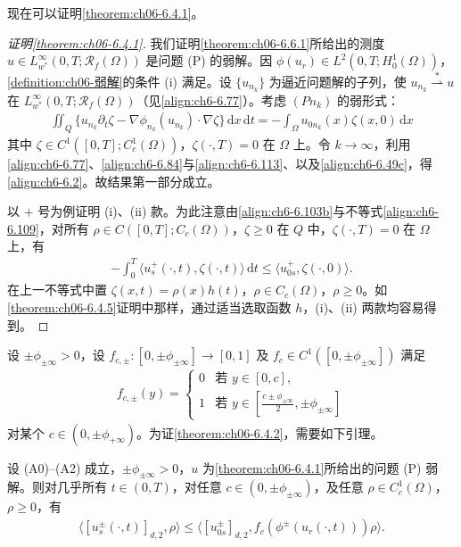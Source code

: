 \documentclass[../../main.tex]{subfiles}%
\begin{document}
现在可以证明\cref{theorem:ch06-6.4.1}。

\begin{proof}[证明\cref{theorem:ch06-6.4.1}]
我们证明\cref{theorem:ch06-6.6.1}所给出的测度 $u\in L^\infty_{w^*}(0,T;\mathscr{R}_f(\Omega))$ 是问题 (P) 的弱解。因 $\phi(u_r)\in L^2(0,T;H^1_0(\Omega))$，\cref{definition:ch06-弱解}的条件 (i) 满足。设 $\{u_{n_k}\}$ 为逼近问题解的子列，使 $u_{n_k}\stackrel{*}{\rightharpoonup}u$ 在 $L^\infty_{w^*}(0,T;\mathscr{R}_f(\Omega))$（见\eqref{align:ch6-6.77}）。考虑 $(Pn_k)$ 的弱形式：
\begin{align*}
\iint_Q\{u_{n_k}\partial_t\zeta-\nabla\phi_{n_k}(u_{n_k})\cdot\nabla\zeta\}\,\mathrm{d}x\,\mathrm{d}t
=-\int_\Omega u_{0n_k}(x)\zeta(x,0)\,\mathrm{d}x
\end{align*}
其中 $\zeta\in C^1([0,T];C^1_c(\Omega))$，$\zeta(\cdot,T)=0$ 在 $\Omega$ 上。令 $k\to\infty$，利用\eqref{align:ch6-6.77}、\eqref{align:ch6-6.84}与\eqref{align:ch6-6.113}、以及\eqref{align:ch6-6.49c}，得\eqref{align:ch6-6.2}。故结果第一部分成立。

以 $+$ 号为例证明 (i)、(ii) 款。为此注意由\eqref{align:ch6-6.103b}与不等式\eqref{align:ch6-6.109}，对所有 $\rho\in C([0,T];C_c(\Omega))$，$\zeta\geqslant0$ 在 $Q$ 中，$\zeta(\cdot,T)=0$ 在 $\Omega$ 上，有
\begin{align*}
-\int_0^T\langle u^+_s(\cdot,t),\zeta(\cdot,t)\rangle\,\mathrm{d}t
\leqslant\langle u^+_{0s},\zeta(\cdot,0)\rangle.
\end{align*}
在上一不等式中置 $\zeta(x,t)=\rho(x)h(t)$，$\rho\in C_c(\Omega)$，$\rho\geqslant0$。如\cref{theorem:ch06-6.4.5}证明中那样，通过适当选取函数 $h$，(i)、(ii) 两款均容易得到。
\end{proof}

设 $\pm\phi_{\pm\infty}>0$，设 $f_{c,\pm}:[0,\pm\phi_{\pm\infty}]\to[0,1]$ 及 $f_c\in C^1([0,\pm\phi_{\pm\infty}])$ 满足
\begin{align}
f_{c,\pm}(y)=
\begin{cases}
0 & \text{若 }y\in[0,c],\\
1 & \text{若 }y\in[\frac{c\pm\phi_{\pm\infty}}{2},\pm\phi_{\pm\infty}]
\end{cases} \label{align:ch6-6.117}
\end{align}
对某个 $c\in(0,\pm\phi_{+\infty})$。为证\cref{theorem:ch06-6.4.2}，需要如下引理。

\begin{lemma}\label{lemma:ch06-6.6.7}
设 (A0)--(A2) 成立，$\pm\phi_{\pm\infty}>0$，$u$ 为\cref{theorem:ch06-6.4.1}所给出的问题 (P) 弱解。则对几乎所有 $t\in(0,T)$，对任意 $c\in(0,\pm\phi_{\pm\infty})$，及任意 $\rho\in C^1_c(\Omega)$，$\rho\geqslant0$，有
\begin{align}
\langle[u^\pm_s(\cdot,t)]_{d,2},\rho\rangle
\leqslant\langle[u^\pm_{0s}]_{d,2},f_c(\phi^\pm(u_r(\cdot,t)))\rho\rangle. \label{align:ch6-6.118}
\end{align}
\end{lemma}
\end{document}

